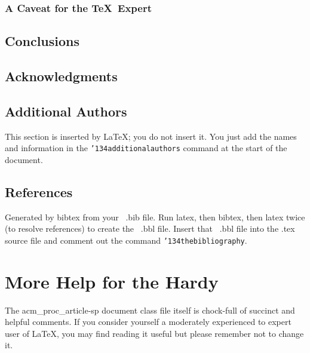 \documentclass{acm_proc_article-sp}
\begin{document}
\subsubsection*{A Caveat for the \TeX\ Expert}
\subsection{Conclusions}
\subsection{Acknowledgments}
\subsection{Additional Authors}
This section is inserted by \LaTeX; you do not insert it.
You just add the names and information in the
\texttt{{\char'134}additionalauthors} command at the start
of the document.
\subsection{References}
Generated by bibtex from your ~.bib file.  Run latex,
then bibtex, then latex twice (to resolve references)
to create the ~.bbl file.  Insert that ~.bbl file into
the .tex source file and comment out
the command \texttt{{\char'134}thebibliography}.
\section{More Help for the Hardy}
The acm\_proc\_article-sp document class file itself is chock-full of succinct
and helpful comments.  If you consider yourself a moderately
experienced to expert user of \LaTeX, you may find reading
it useful but please remember not to change it.
\balancecolumns
\end{document}
